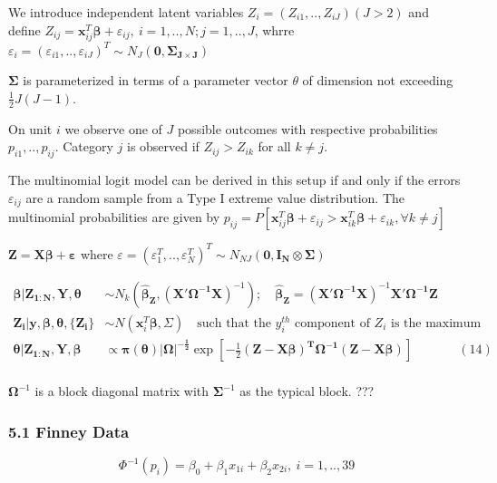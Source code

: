 \documentclass[
]{article}
\begin{document}
We introduce independent latent variables
\(Z_i=(Z_{i1},..,Z_{iJ})(J>2)\) and define
\(Z_{ij}=\mathbf{x}_{ij}^T\boldsymbol{\beta}+\varepsilon_{ij},\ i=1,..,N;j=1,..,J\),
whrre
\(\varepsilon_i=(\varepsilon_{i1},..,\varepsilon_{iJ})^T\sim N_J(\mathbf{0,\Sigma_{J\times J}})\)

\(\mathbf{\Sigma}\) is parameterized in terms of a parameter vector
\(\theta\) of dimension not exceeding \(\frac12J(J-1)\).

On unit \(i\) we observe one of \(J\) possible outcomes with respective
probabilities \(p_{i1},..,p_{ij}\). Category \(j\) is observed if
\(Z_{ij}>Z_{ik}\) for all \(k\neq j\).

The multinomial logit model can be derived in this setup if and only if
the errors \(\varepsilon_{ij}\) are a random sample from a Type I
extreme value distribution. The multinomial probabilities are given by
\(p_{ij}=P[\mathbf{x}_{ij}^T\boldsymbol{\beta}+\varepsilon_{ij}>\mathbf{x}_{ik}^T\boldsymbol{\beta}+\varepsilon_{ik}, \forall k\neq j]\)

\(\mathbf{Z=X}\boldsymbol{\beta+\varepsilon}\) where
\(\varepsilon=(\varepsilon_{1}^T,..,\varepsilon_{N}^T)^T\sim N_{NJ}(\mathbf{0,I_N\otimes\Sigma})\)

\[
\begin{align} 
\boldsymbol{\beta|Z_{1:N},Y,\theta}&\sim N_k(\boldsymbol{\hat\beta_{Z}},(\mathbf{X'\Omega^{-1} X})^{-1}); \quad\boldsymbol{\hat\beta_{Z}}=(\mathbf{X'\Omega^{-1} X})^{-1}\mathbf{X'\Omega^{-1} Z}\\
\boldsymbol{Z_i|y,\beta,\theta,\{Z_i\}}&\sim N(\mathbf{x}_i^T\boldsymbol{\beta},\Sigma) \quad\text{such that
 the }y_i^{th}\text{ component of }Z_i\text{ is the maximum}  &&\\
\boldsymbol{\theta|Z_{1:N},Y,\beta}&\propto \boldsymbol{\pi(\theta)|\Omega|^{-\frac12}} \exp\left[-\frac12\boldsymbol{(Z-X\beta)^T\Omega^{-1}(Z-X\beta)}\right]&&(14)\\
\end{align}
\]

\(\mathbf{\Omega}^{-1}\) is a block diagonal matrix with
\(\mathbf{\Sigma}^{-1}\) as the typical block. { ???}

\hypertarget{finney-data}{%
\subsubsection{5.1 Finney Data}\label{finney-data}}

\[\Phi^{-1}(p_i)=\beta_0+\beta_1x_{1i}+\beta_2x_{2i},\ i=1,..,39\]
\end{document}
